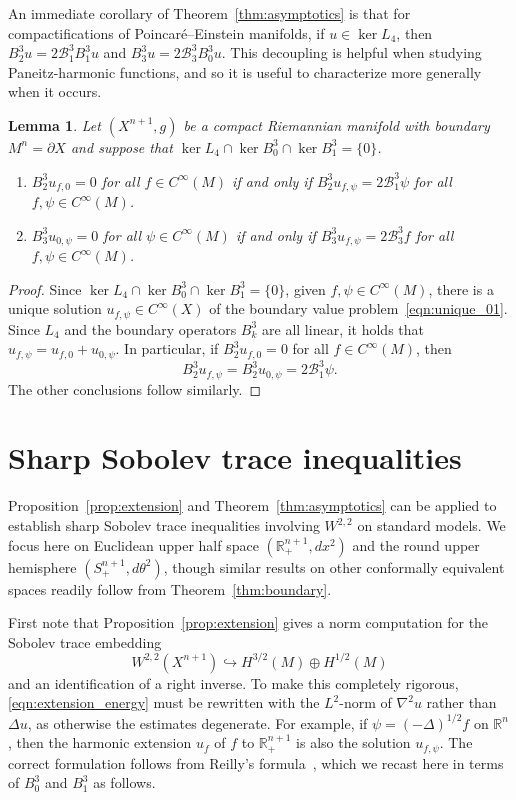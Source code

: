 \documentclass{amsart}
\newtheorem{lem}[thm]{Lemma}
\theoremstyle{definition}
\theoremstyle{remark}
\numberwithin{equation}{section}
\begin{document}
An immediate corollary of Theorem~\ref{thm:asymptotics} is that for compactifications of Poincar\'e--Einstein manifolds, if $u\in\ker L_4$, then $B_2^3u=2{\mathcal{B}}_1^3B_1^3u$ and $B_3^3u=2{\mathcal{B}}_3^3B_0^3u$.  This decoupling is helpful when studying Paneitz-harmonic functions, and so it is useful to characterize more generally when it occurs.

\begin{lem}
 \label{lem:mB_uniqueness}
 Let $(X^{n+1},g)$ be a compact Riemannian manifold with boundary $M^n=\partial X$ and suppose that $\ker L_4\cap\ker B_0^3\cap\ker B_1^3=\{0\}$.
 \begin{enumerate}
  \item $B_2^3u_{f,0}=0$ for all $f\in C^\infty(M)$ if and only if $B_2^3u_{f,\psi}=2{\mathcal{B}}_1^3\psi$ for all $f,\psi\in C^\infty(M)$.
  \item $B_3^3u_{0,\psi}=0$ for all $\psi\in C^\infty(M)$ if and only if $B_3^3u_{f,\psi}=2{\mathcal{B}}_3^3f$ for all $f,\psi\in C^\infty(M)$.
 \end{enumerate}
\end{lem}

\begin{proof}
 Since $\ker L_4\cap\ker B_0^3\cap\ker B_1^3=\{0\}$, given $f,\psi\in C^\infty(M)$, there is a unique solution $u_{f,\psi}\in C^\infty(X)$ of the boundary value problem~\eqref{eqn:unique_01}.  Since $L_4$ and the boundary operators $B_k^3$ are all linear, it holds that $u_{f,\psi}=u_{f,0}+u_{0,\psi}$.  In particular, if $B_2^3u_{f,0}=0$ for all $f\in C^\infty(M)$, then
 \[ B_2^3u_{f,\psi} = B_2^3u_{0,\psi} = 2{\mathcal{B}}_1^3\psi . \]
 The other conclusions follow similarly.
\end{proof}

\section{Sharp Sobolev trace inequalities}
\label{sec:sobolev}

Proposition~\ref{prop:extension} and Theorem~\ref{thm:asymptotics} can be applied to establish sharp Sobolev trace inequalities involving $W^{2,2}$ on standard models.  We focus here on Euclidean upper half space $({\mathbb{R}}_+^{n+1},dx^2)$ and the round upper hemisphere $(S_+^{n+1},d\theta^2)$, though similar results on other conformally equivalent spaces readily follow from Theorem~\ref{thm:boundary}.

First note that Proposition~\ref{prop:extension} gives a norm computation for the Sobolev trace embedding
\[ W^{2,2}(X^{n+1}) \hookrightarrow H^{3/2}(M) \oplus H^{1/2}(M) \]
and an identification of a right inverse.  To make this completely rigorous, \eqref{eqn:extension_energy} must be rewritten with the $L^2$-norm of $\nabla^2u$ rather than $\Delta u$, as otherwise the estimates degenerate.  For example, if $\psi=(-\Delta)^{1/2}f$ on ${\mathbb{R}}^n$, then the harmonic extension $u_f$ of $f$ to ${\mathbb{R}}_+^{n+1}$ is also the solution $u_{f,\psi}$.  The correct formulation follows from Reilly's formula~\cite{Reilly1977}, which we recast here in terms of $B_0^3$ and $B_1^3$ as follows.
\end{document}
